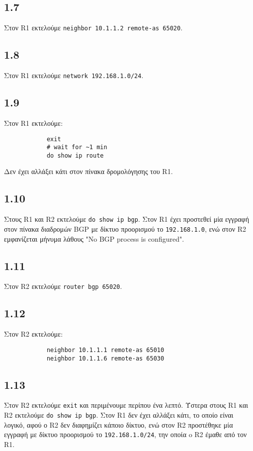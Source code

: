 \documentclass[a4paper, 12pt]{article}
\begin{document}
	\subsection*{1.7}
		Στον R1 εκτελούμε \verb|neighbor 10.1.1.2 remote-as 65020|.

	\subsection*{1.8}
		Στον R1 εκτελούμε \verb|network 192.168.1.0/24|.

	\subsection*{1.9}
		Στον R1 εκτελούμε:
		
		\begin{verbatim}
			exit 
			# wait for ~1 min
			do show ip route
		\end{verbatim}
		
		Δεν έχει αλλάξει κάτι στον πίνακα δρομολόγησης του R1.

	\subsection*{1.10}
		Στους R1 και R2 εκτελούμε \verb|do show ip bgp|. Στον R1 έχει προστεθεί μία εγγραφή στον πίνακα διαδρομών BGP με δίκτυο προορισμού το \verb|192.168.1.0|, ενώ στον R2 εμφανίζεται μήνυμα λάθους "No BGP process is configured".

	\subsection*{1.11}
		Στον R2 εκτελούμε \verb|router bgp 65020|.

	\subsection*{1.12}
		Στον R2 εκτελούμε:
		
		\begin{verbatim}
			neighbor 10.1.1.1 remote-as 65010
			neighbor 10.1.1.6 remote-as 65030
		\end{verbatim}

	\subsection*{1.13}
		Στον R2 εκτελούμε \verb|exit| και περιμένουμε περίπου ένα λεπτό. Ύστερα στους R1 και R2 εκτελούμε \verb|do show ip bgp|. Στον R1 δεν έχει αλλάξει κάτι, το οποίο είναι λογικό, αφού ο R2 δεν διαφημίζει κάποιο δίκτυο, ενώ στον R2 προστέθηκε μία εγγραφή με δίκτυο προορισμού το \verb|192.168.1.0/24|, την οποία o R2 έμαθε από τον R1. 
		
\end{document}
